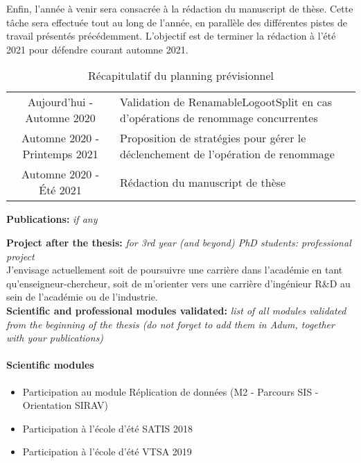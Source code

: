 \documentclass[12pt]{article}
\newcommand{\commentaire}[1]{\small\textit{#1}}
\begin{document}
Enfin, l'année à venir sera consacrée à la rédaction du manuscript de thèse.
Cette tâche sera effectuée tout au long de l'année, en parallèle des différentes pistes de travail présentés précédemment.
L'objectif est de terminer la rédaction à l'été 2021 pour défendre courant automne 2021.
\\

\begin{table}
  \small
  \begin{tabular} {c | p{11cm}}
    Aujourd'hui - Automne 2020 & Validation de RenamableLogootSplit en cas d'opérations de renommage concurrentes \\
    Automne 2020 - Printemps 2021 & Proposition de stratégies pour gérer le déclenchement de l'opération de renommage \\
    Automne 2020 - Été 2021 & Rédaction du manuscript de thèse
  \end{tabular}
  \caption{Récapitulatif du planning prévisionnel}
\end{table}

\noindent\textbf{Publications:}
\commentaire{%
  if any\\}


\nocite{*}

\noindent\textbf{Project after the thesis:}
\commentaire{%
  for 3rd year (and beyond) PhD students: professional project\\}
J'envisage actuellement soit de poursuivre une carrière dans l'académie en tant qu'enseigneur-chercheur, soit de m'orienter vers une carrière d'ingénieur R\&D au sein de l'académie ou de l'industrie.
\\

\noindent\textbf{Scientific and professional modules validated:}
\commentaire{%
  list of all modules validated from the beginning of the thesis (do
  not forget to add them in Adum, together with your publications)}
\paragraph{\footnotesize Scientific modules}
  \begin{itemize}
      \itemsep0em
      \item Participation au module Réplication de données (M2 - Parcours SIS - Orientation SIRAV)
      \item Participation à l'école d'été SATIS 2018
      \item Participation à l'école d'été VTSA 2019
  \end{itemize}
\end{document}
